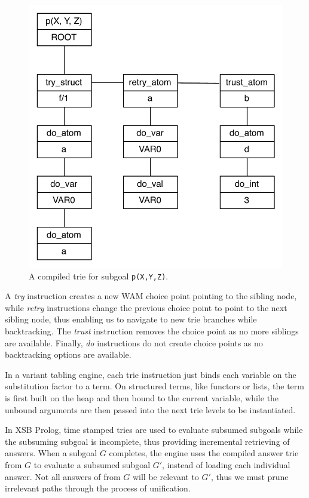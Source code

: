 \begin{figure}[h]
  \centering
    \includegraphics[scale=0.6]{compiled_trie.pdf}
  \caption{A compiled trie for subgoal \texttt{p(X,Y,Z)}.}
  \label{fig:compiled_trie}
\end{figure}

A \textit{try} instruction creates a new WAM choice point pointing to the sibling node,
while \textit{retry} instructions change the previous choice point to point to the next sibling node,
thus enabling us to navigate to new trie branches while backtracking. The \textit{trust}
instruction removes the choice point as no more siblings are available. Finally, \textit{do}
instructions do not create choice points as no backtracking options are available.

In a variant tabling engine, each trie instruction just binds each variable on the substitution factor to a term.
On structured terms, like functors or lists, the term is first built on the heap and then
bound to the current variable, while the unbound arguments are then passed into the next trie levels
to be instantiated.

In XSB Prolog, time stamped tries are used to evaluate subsumed subgoals while the subsuming subgoal
is incomplete, thus providing incremental retrieving of answers.
When a subgoal $G$ completes, the engine uses the compiled answer trie from $G$
to evaluate a subsumed subgoal $G'$, instead of loading each individual answer.
Not all answers of from $G$ will be relevant to $G'$, thus we must prune irrelevant paths
through the process of unification. 

